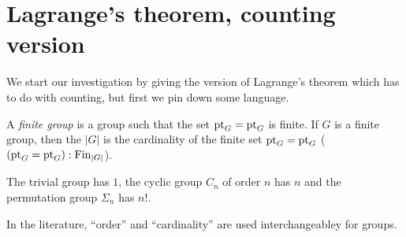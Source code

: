 


\section{Lagrange's theorem, counting version}
\label{sec:Lagrangecounting}

We start our investigation by giving the version of Lagrange's theorem which has to do with counting, but first we pin down some language.
\begin{definition}
  \label{def:finitegrd}
A \emph{finite group} is a group such that the set ${\mathord{\mathrm{pt}}}_G={\mathord{\mathrm{pt}}}_G$ is finite.   If $G$ is a finite group, then the \emph{\gporder}\index{\gporder} $|G|$ is the cardinality of the finite set ${\mathord{\mathrm{pt}}}_G={\mathord{\mathrm{pt}}}_G$ (\ie $({\mathord{\mathrm{pt}}}_G={\mathord{\mathrm{pt}}}_G):\operatorname{Fin}_{|G|}$).
\end{definition}
\begin{example}
  The trivial group has \gporder $1$, the cyclic group $C_n$ of order $n$ has \gporder $n$ %
and the permutation group $\Sigma_n$ has \gporder $n!$.
\end{example}


In the literature, ``order'' and ``cardinality'' are used interchangeabley for groups.


